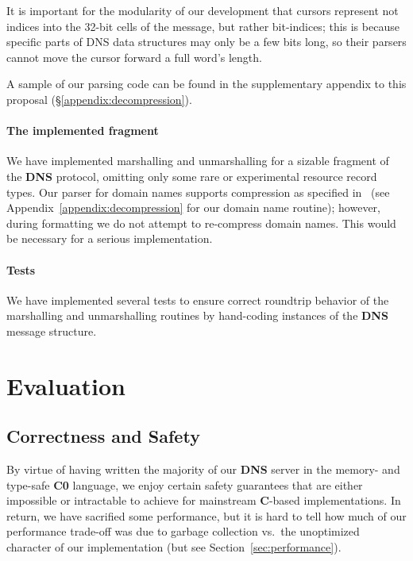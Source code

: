 \documentclass{article}
\newcommand\Kwd[1]{{\sffamily\bfseries{#1}}}
\begin{document}
It is important for the modularity of our development that cursors
represent not indices into the 32-bit cells of the message, but rather
bit-indices; this is because specific parts of DNS data structures may
only be a few bits long, so their parsers cannot move the cursor
forward a full word's length.

A sample of our parsing code can be found in the supplementary
appendix to this proposal (\S\ref{appendix:decompression}).

\paragraph{The implemented fragment}

We have implemented marshalling and unmarshalling for a sizable
fragment of the \Kwd{DNS} protocol, omitting only some rare or
experimental resource record types. Our parser for domain names
supports compression as specified in~\cite{rfc:1035} (see
Appendix~\ref{appendix:decompression} for our domain name routine);
however, during formatting we do not attempt to re-compress domain
names. This would be necessary for a serious implementation.

\paragraph{Tests}

We have implemented several tests to ensure correct roundtrip behavior
of the marshalling and unmarshalling routines by hand-coding instances
of the \Kwd{DNS} message structure.

\section{Evaluation}

\subsection{Correctness and Safety}

By virtue of having written the majority of our \Kwd{DNS} server in
the memory- and type-safe \Kwd{C0} language, we enjoy certain safety
guarantees that are either impossible or intractable to achieve for
mainstream \Kwd{C}-based implementations. In return, we have sacrified
some performance, but it is hard to tell how much of our performance
trade-off was due to garbage collection vs.\ the unoptimized character of
our implementation (but see Section~\ref{sec:performance}).
\end{document}
